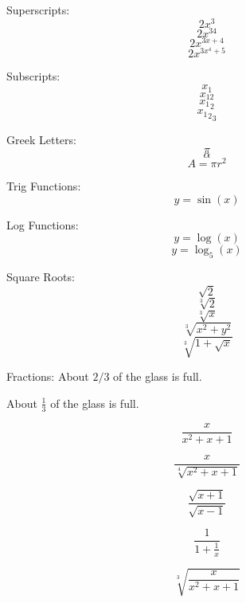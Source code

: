 \documentclass[11pt]{article}
\begin{document}
Superscripts: 
$$2x^3$$
$$2x^34$$
$$2x^{3x+4}$$
$$2x^{3x^4+5}$$

Subscripts:
$$x_1$$
$$x_{12}$$
$${x_1}_2$$
$${{x_1}_2}_3$$

Greek Letters:
$$\pi$$
$$\alpha$$
$$A=\pi r^2$$

Trig Functions:
$$y=\sin(x)$$

Log Functions:
$$y=\log(x)$$
$$y=\log_5(x)$$

Square Roots:
$$\sqrt{2}$$
$$\sqrt[3]{2}$$
$$\sqrt[3]{x}$$
$$\sqrt[3]{x^2+y^2}$$
$$\sqrt[3]{1+\sqrt{x}}$$

Fractions:
About $2/3$ of the glass is full.

About $\displaystyle{\frac{1}{3}}$ of the glass is full.

$$\frac{x}{x^2+x+1}$$

$$\frac{x}{\sqrt[4]{x^2+x+1}}$$

$$\frac{\sqrt{x+1}}{\sqrt{x-1}}$$

$$\frac{1}{1+\frac{1}{x}}$$

$$\sqrt[3]{\frac{x}{x^2+x+1}}$$
\end{document}
